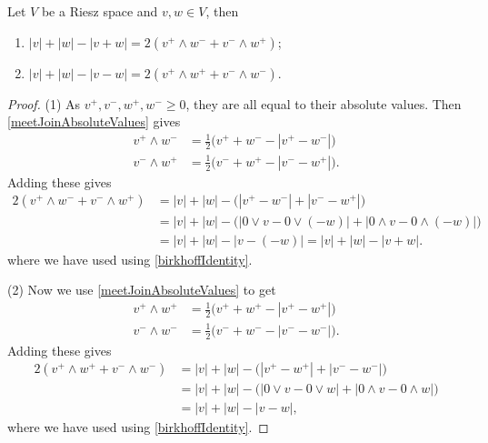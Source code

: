 \begin{proposition} \label{offPerpendicularTerms}
Let $V$ be a Riesz space and $v,w\in V$, then
\begin{enumerate}
\item $|v| + |w| - |v+w| = 2(v^+\wedge w^- + v^-\wedge w^+)$;
\item $|v| + |w| - |v-w| = 2(v^+\wedge w^+ + v^-\wedge w^-)$.
\end{enumerate}
\end{proposition}
\begin{proof}
(1) As $v^+, v^-, w^+, w^- \geq 0$, they are all equal to their absolute values. Then \ref{meetJoinAbsoluteValues} gives
\begin{align*}
v^+\wedge w^- &= \frac{1}{2}\big(v^++w^- - |v^+-w^-|\big) \\
v^-\wedge w^+ &= \frac{1}{2}\big(v^-+w^+ - |v^--w^+|\big). 
\end{align*}
Adding these gives
\begin{align*}
2(v^+\wedge w^- + v^-\wedge w^+) &= |v| + |w| - \big(|v^+-w^-|+ |v^--w^+|\big) \\
&= |v| + |w| - \big(|0\vee v - 0\vee (-w)|+ |0\wedge v- 0\wedge (-w)|\big) \\
&= |v| + |w| - |v- (-w)| = |v| + |w| - |v + w|.
\end{align*}
where we have used using \ref{birkhoffIdentity}.

(2) Now we use \ref{meetJoinAbsoluteValues} to get
\begin{align*}
v^+\wedge w^+ &= \frac{1}{2}\big(v^++w^+ - |v^+-w^+|\big) \\
v^-\wedge w^- &= \frac{1}{2}\big(v^-+w^- - |v^--w^-|\big). 
\end{align*}
Adding these gives
\begin{align*}
2(v^+\wedge w^+ + v^-\wedge w^-) &= |v| + |w| - \big(|v^+-w^+|+ |v^--w^-|\big) \\
&= |v| + |w| - \big(|0\vee v - 0\vee w|+ |0\wedge v- 0\wedge w|\big) \\
&= |v| + |w| - |v- w|,
\end{align*}
where we have used using \ref{birkhoffIdentity}.
\end{proof}


